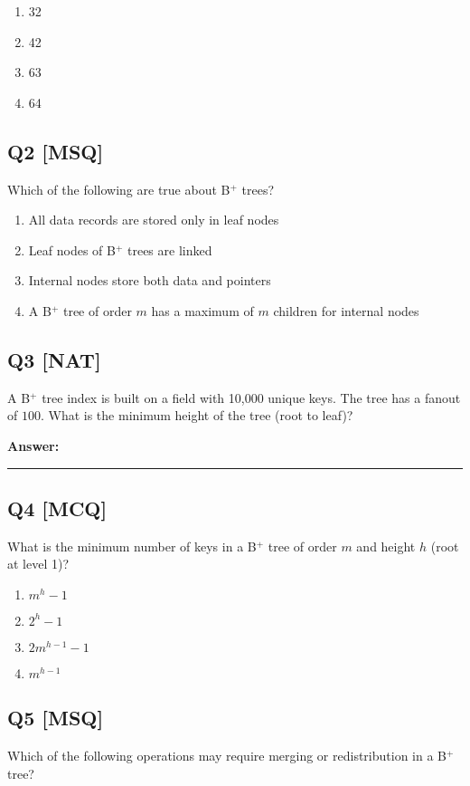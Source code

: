 \begin{enumerate}[label=(\alph*)]
    \item 32
    \item 42
    \item 63
    \item 64
\end{enumerate}

\subsection*{Q2 [MSQ]}
Which of the following are true about B$^+$ trees?
  
\begin{enumerate}[label=(\alph*)]
    \item All data records are stored only in leaf nodes
    \item Leaf nodes of B$^+$ trees are linked
    \item Internal nodes store both data and pointers
    \item A B$^+$ tree of order $m$ has a maximum of $m$ children for internal nodes
\end{enumerate}

\subsection*{Q3 [NAT]}
A B$^+$ tree index is built on a field with 10,000 unique keys. The tree has a fanout of $100$. What is the minimum height of the tree (root to leaf)?

\textbf{Answer:} \rule{3cm}{0.15mm}

\subsection*{Q4 [MCQ]}
What is the minimum number of keys in a B$^+$ tree of order $m$ and height $h$ (root at level 1)?

\begin{enumerate}[label=(\alph*)]
    \item $m^{h} - 1$  
    \item $2^{h} - 1$  
    \item $2m^{h-1} - 1$  
    \item $m^{h-1}$
\end{enumerate}


\subsection*{Q5 [MSQ]}
Which of the following operations may require merging or redistribution in a B$^+$ tree?

